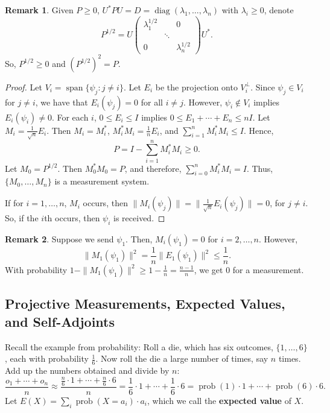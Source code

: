 \documentclass[12pt]{article}
\theoremstyle{definition}
\newtheorem*{remark}{Remark}
\newcommand{\norm}[1]{\|#1\|}
\begin{document}
\begin{remark}
Given $P \geq 0$, $U^*PU = D = \operatorname{diag}(\lambda_1,\ldots,\lambda_n)$ with $\lambda_i \geq 0$, denote
\[
P^{1/2} = U \begin{pmatrix} \lambda_1^{1/2} & & 0 \\ & \ddots & \\ 0 & & \lambda_n^{1/2} \end{pmatrix} U^*.
\]
So, $P^{1/2} \geq 0$ and $(P^{1/2})^2 = P$.
\end{remark}

\begin{proof}
Let $V_i = \operatorname{span}\{\psi_j : j \neq i\}$. Let $E_i$ be the projection onto $V_i^\perp$. Since $\psi_j \in V_i$ for $j \neq i$, we have that $E_i(\psi_j) = 0$ for all $i \neq j$. However, $\psi_i \notin V_i$ implies $E_i(\psi_i) \neq 0$. For each $i$, $0 \leq E_i \leq I$ implies $0 \leq E_1 + \cdots + E_n \leq nI$. Let $M_i = \frac{1}{\sqrt{n}}E_i$. Then $M_i = M_i^*$, $M_i^*M_i = \frac{1}{n}E_i$, and $\sum_{i=1}^n M_i^*M_i \leq I$. Hence,
\[
P = I - \sum_{i=1}^n M_i^*M_i \geq 0.
\]
Let $M_0 = P^{1/2}$. Then $M_0^*M_0 = P$, and therefore, $\sum_{i=0}^n M_i^*M_i = I$. Thus, $\{M_0,\ldots,M_n\}$ is a measurement system.

If for $i = 1,\ldots,n$, $M_i$ occurs, then $\norm{M_i(\psi_j)} = \norm{\frac{1}{\sqrt{n}}E_i(\psi_j)} = 0$, for $j \neq i$. So, if the $i$th occurs, then $\psi_i$ is received.
\end{proof}

\begin{remark}
Suppose we send $\psi_1$. Then, $M_i(\psi_1) = 0$ for $i = 2,\ldots,n$. However,
\[
\norm{M_1(\psi_1)}^2 = \frac{1}{n}\norm{E_1(\psi_1)}^2 \leq \frac{1}{n}.
\]
With probability $1 - \norm{M_1(\psi_1)}^2 \geq 1 - \frac{1}{n} = \frac{n-1}{n}$, we get $0$ for a measurement.
\end{remark}

\subsection{Projective Measurements, Expected Values, and Self-Adjoints}

Recall the example from probability: Roll a die, which has six outcomes, $\{1,\ldots,6\}$, each with probability $\frac{1}{6}$. Now roll the die a large number of times, say $n$ times. Add up the numbers obtained and divide by $n$:
\[
\frac{o_1 + \cdots + o_n}{n} \approx \frac{\frac{n}{6} \cdot 1 + \cdots + \frac{n}{6} \cdot 6}{n} = \frac{1}{6} \cdot 1 + \cdots + \frac{1}{6} \cdot 6 = \operatorname{prob}(1) \cdot 1 + \cdots + \operatorname{prob}(6) \cdot 6.
\]
Let $E(X) = \sum_i \operatorname{prob}(X = a_i) \cdot a_i$, which we call the \textbf{expected value} of $X$.
\end{document}
